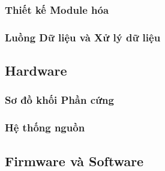             \subsubsection{Thiết kế Module hóa}
            \subsubsection{Luồng Dữ liệu và Xử lý dữ liệu}
        \subsection{Hardware}
            \subsubsection{Sơ đồ khối Phần cứng}
            \subsubsection{Hệ thống nguồn}
        \subsection{Firmware và Software}
